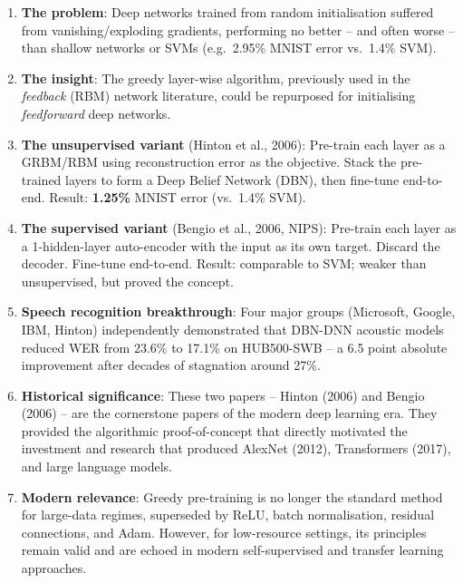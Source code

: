 \documentclass[12pt,a4paper]{article}
\begin{document}
\begin{enumerate}[leftmargin=*, label=\textbf{\arabic*.}]
  \item \textbf{The problem}: Deep networks trained from random initialisation
        suffered from vanishing/exploding gradients, performing no better --
        and often worse -- than shallow networks or SVMs (e.g.\ 2.95\% MNIST
        error vs.\ 1.4\% SVM).

  \item \textbf{The insight}: The greedy layer-wise algorithm, previously used
        in the \emph{feedback} (RBM) network literature, could be repurposed
        for initialising \emph{feedforward} deep networks.

  \item \textbf{The unsupervised variant} (Hinton et al., 2006): Pre-train
        each layer as a GRBM/RBM using reconstruction error as the objective.
        Stack the pre-trained layers to form a Deep Belief Network (DBN), then
        fine-tune end-to-end.  Result: \textbf{1.25\%} MNIST error (vs.\
        1.4\% SVM).

  \item \textbf{The supervised variant} (Bengio et al., 2006, NIPS): Pre-train
        each layer as a 1-hidden-layer auto-encoder with the input as its own
        target.  Discard the decoder.  Fine-tune end-to-end.  Result:
        comparable to SVM; weaker than unsupervised, but proved the concept.

  \item \textbf{Speech recognition breakthrough}: Four major groups
        (Microsoft, Google, IBM, Hinton) independently demonstrated that
        DBN-DNN acoustic models reduced WER from 23.6\% to 17.1\% on
        HUB500-SWB -- a 6.5 point absolute improvement after decades of
        stagnation around 27\%.

  \item \textbf{Historical significance}: These two papers -- Hinton (2006)
        and Bengio (2006) -- are the cornerstone papers of the modern deep
        learning era.  They provided the algorithmic proof-of-concept that
        directly motivated the investment and research that produced AlexNet
        (2012), Transformers (2017), and large language models.

  \item \textbf{Modern relevance}: Greedy pre-training is no longer the
        standard method for large-data regimes, superseded by ReLU, batch
        normalisation, residual connections, and Adam.  However, for
        low-resource settings, its principles remain valid and are echoed
        in modern self-supervised and transfer learning approaches.
\end{enumerate}
\end{document}
